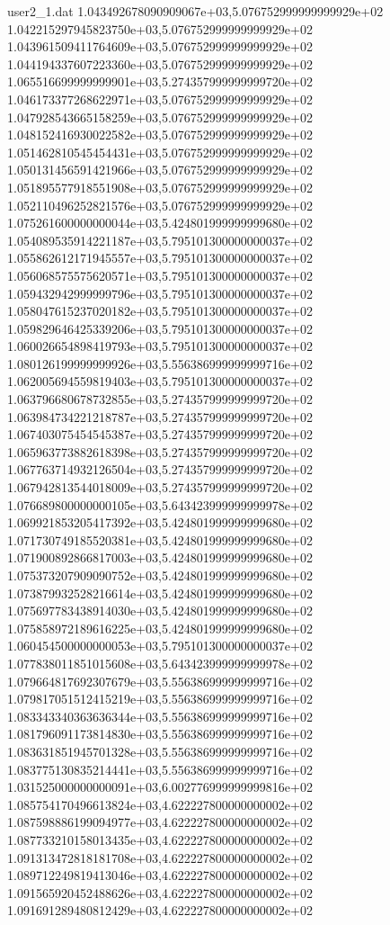 \begin{filecontents}{user2_1.dat}
1.043492678090909067e+03,5.076752999999999929e+02
1.042215297945823750e+03,5.076752999999999929e+02
1.043961509411764609e+03,5.076752999999999929e+02
1.044194337607223360e+03,5.076752999999999929e+02
1.065516699999999901e+03,5.274357999999999720e+02
1.046173377268622971e+03,5.076752999999999929e+02
1.047928543665158259e+03,5.076752999999999929e+02
1.048152416930022582e+03,5.076752999999999929e+02
1.051462810545454431e+03,5.076752999999999929e+02
1.050131456591421966e+03,5.076752999999999929e+02
1.051895577918551908e+03,5.076752999999999929e+02
1.052110496252821576e+03,5.076752999999999929e+02
1.075261600000000044e+03,5.424801999999999680e+02
1.054089535914221187e+03,5.795101300000000037e+02
1.055862612171945557e+03,5.795101300000000037e+02
1.056068575575620571e+03,5.795101300000000037e+02
1.059432942999999796e+03,5.795101300000000037e+02
1.058047615237020182e+03,5.795101300000000037e+02
1.059829646425339206e+03,5.795101300000000037e+02
1.060026654898419793e+03,5.795101300000000037e+02
1.080126199999999926e+03,5.556386999999999716e+02
1.062005694559819403e+03,5.795101300000000037e+02
1.063796680678732855e+03,5.274357999999999720e+02
1.063984734221218787e+03,5.274357999999999720e+02
1.067403075454545387e+03,5.274357999999999720e+02
1.065963773882618398e+03,5.274357999999999720e+02
1.067763714932126504e+03,5.274357999999999720e+02
1.067942813544018009e+03,5.274357999999999720e+02
1.076689800000000105e+03,5.643423999999999978e+02
1.069921853205417392e+03,5.424801999999999680e+02
1.071730749185520381e+03,5.424801999999999680e+02
1.071900892866817003e+03,5.424801999999999680e+02
1.075373207909090752e+03,5.424801999999999680e+02
1.073879932528216614e+03,5.424801999999999680e+02
1.075697783438914030e+03,5.424801999999999680e+02
1.075858972189616225e+03,5.424801999999999680e+02
1.060454500000000053e+03,5.795101300000000037e+02
1.077838011851015608e+03,5.643423999999999978e+02
1.079664817692307679e+03,5.556386999999999716e+02
1.079817051512415219e+03,5.556386999999999716e+02
1.083343340363636344e+03,5.556386999999999716e+02
1.081796091173814830e+03,5.556386999999999716e+02
1.083631851945701328e+03,5.556386999999999716e+02
1.083775130835214441e+03,5.556386999999999716e+02
1.031525000000000091e+03,6.002776999999999816e+02
1.085754170496613824e+03,4.622227800000000002e+02
1.087598886199094977e+03,4.622227800000000002e+02
1.087733210158013435e+03,4.622227800000000002e+02
1.091313472818181708e+03,4.622227800000000002e+02
1.089712249819413046e+03,4.622227800000000002e+02
1.091565920452488626e+03,4.622227800000000002e+02
1.091691289480812429e+03,4.622227800000000002e+02

\end{filecontents}
